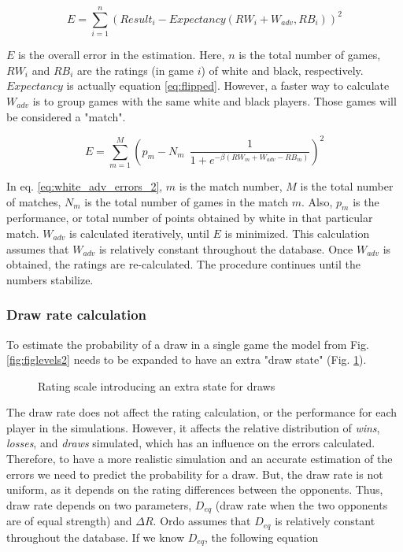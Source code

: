 \documentclass[12pt]{article}
\begin{document}
	\begin{equation} \label{eq:white_adv_errors_1}
	E = \sum\limits_{i=1}^n (Result_{i} - Expectancy(RW_{i} + W_{adv}, RB_{i}))^2
	\end{equation}

$E$ is the overall error in the estimation.
Here, $n$ is the total number of games, $RW_{i}$ and $RB_{i}$ are the ratings (in game $i$) of white and black, respectively.
$Expectancy$ is actually equation \ref{eq:flipped}.
However, a faster way to calculate $W_{adv}$ is to group games with the same white and black players. 
Those games will be considered a "match".

	\begin{equation} \label{eq:white_adv_errors_2}
	E = \sum\limits_{m=1}^M \left(p_{m} - N_{m}\:\: \frac{1}{1 + e^{-\beta(RW_{m} + W_{adv}-RB_{m})}}	\right)^2
	\end{equation}

In eq. \ref{eq:white_adv_errors_2}, $m$ is the match number, $M$ is the total number of matches, $N_{m}$ is the total number of games in the match $m$.
Also, $p_{m}$ is the performance, or total number of points obtained by white in that particular match.
$W_{adv}$ is calculated iteratively, until $E$ is minimized.
This calculation assumes that $W_{adv}$ is relatively constant throughout the database.
Once $W_{adv}$ is obtained, the ratings are re-calculated.
The procedure continues until the numbers stabilize.


\subsubsection*{Draw rate calculation}

To estimate the probability of a draw in a single game the model from Fig. \ref{fig:figlevels2} needs to be expanded to have an extra "draw state" (Fig. \ref{fig:threestates}).

	\begin{figure}[htb]
	\caption{\label{fig:threestates} Rating scale introducing an extra state for draws}
	\end{figure}


The draw rate does not affect the rating calculation, or the performance for each player in the simulations.
However, it affects the relative distribution of \textit{wins}, \textit{losses}, and \textit{draws} simulated, which has an influence on the errors calculated. 
Therefore, to have a more realistic simulation and an accurate estimation of the errors we need to predict the probability for a draw.
But, the draw rate is not uniform, as it depends on the rating differences between the opponents.
Thus, draw rate depends on two parameters, $D_{eq}$ (draw rate when the two opponents are of equal strength) and $\Delta R$.
Ordo assumes that $D_{eq}$ is relatively constant throughout the database.
If we know $D_{eq}$, the following equation
\end{document}
